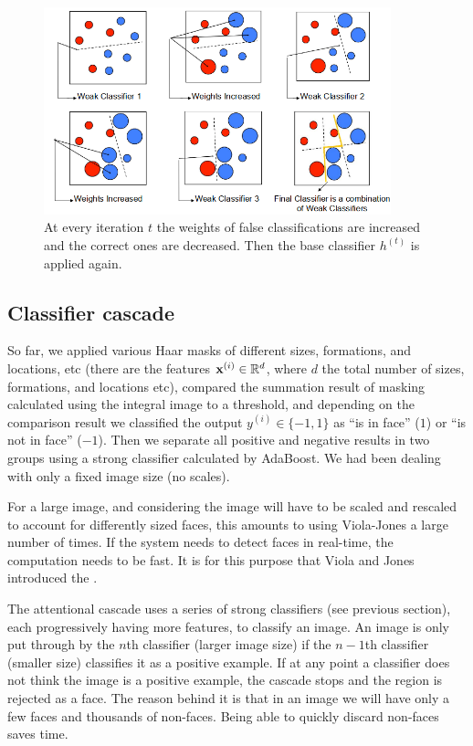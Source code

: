 \documentclass[a4paper]{article}
\begin{document}
\begin{figure}[H]
    \centering
    \includegraphics[height=6cm]{img/ada_adjusting_weights.png}
    \caption{At every iteration $t$ the weights of false classifications are increased and the correct ones are decreased. Then the base classifier $h^{(t)}$ is applied again.}
\end{figure}



\subsection{Classifier cascade}
So far, we applied various Haar masks of different sizes, formations, and locations, etc (there are the features $\textbf{x}^{(i)}\in \mathbb{R}^d$, where $d$ the total number of sizes, formations, and locations etc), compared the summation result of masking calculated using the integral image to a threshold, and depending on the comparison result we classified the output $y^{(i)} \in \{-1,1\}$ as ``is in face'' ($1$) or ``is not in face'' ($-1$). Then we separate all positive and negative results in two groups using a strong classifier calculated by AdaBoost. We had been dealing with only a fixed image size (no scales).  

For a large image, and considering the image will have to be scaled and rescaled to account for differently sized faces, this amounts to using Viola-Jones a large number of times. If the system needs to detect faces in real-time, the computation needs to be fast. It is for this purpose that Viola and Jones introduced the .

The attentional cascade uses a series of strong classifiers (see previous section), each progressively having more features, to classify an image. An image is only put through by the $n$th classifier (larger image size) if the $n-1$th classifier (smaller size) classifies it as a positive example. If at any point a classifier does not think the image is a positive example, the cascade stops and the region is rejected as a face. The reason behind it is that in an image we will have only a few faces and thousands of non-faces. Being able to quickly discard non-faces saves time.
\end{document}
